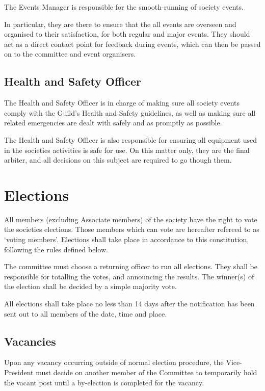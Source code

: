 \documentclass{report}
\begin{document}
	The Events Manager is responsible for the smooth-running of society events.
	
	In particular, they are there to ensure that the all events are overseen and organised to their satisfaction, for both regular and major events. They should act as a direct contact point for feedback during events, which can then be passed on to the committee and event organisers.
	
	\subsection{Health and Safety Officer}
	
	The Health and Safety Officer is in charge of making sure all society events comply with the Guild’s Health and Safety guidelines, as well as making sure all related emergencies are dealt with safely and as promptly as possible.
	
	The Health and Safety Officer is also responsible for ensuring all equipment used in the societies activities is safe for use. On this matter only, they are the final arbiter, and all decisions on this subject are required to go though them.

\section{Elections}
\label{elections}

	All members (excluding Associate members) of the society have the right to vote the societies elections. Those members which can vote are hereafter refereed to as `voting members'. Elections shall take place in accordance to this constitution, following the rules defined below.
	
	The committee must choose a returning officer to run all elections. They shall be responsible for totalling the votes, and announcing the results. The winner(s) of the election shall be decided by a simple majority vote.
	
	All elections shall take place no less than 14 days after the notification has been sent out to all members of the date, time and place.
	
	\subsection{Vacancies}
	
	Upon any vacancy occurring outside of normal election procedure, the Vice-President must decide on another member of the Committee to temporarily hold the vacant post until a by-election is completed for the vacancy.
	
\end{document}
